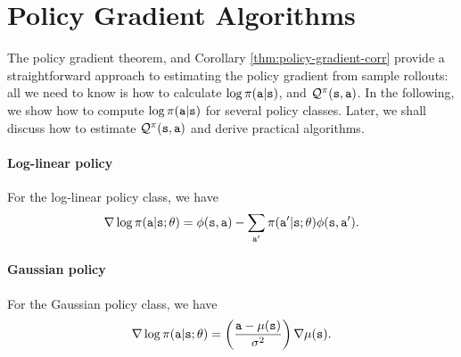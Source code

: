 \section{Policy Gradient Algorithms}

The policy gradient theorem, and Corollary \ref{thm:policy-gradient-corr} provide a straightforward approach to estimating the policy gradient from sample rollouts: all we need to know is how to calculate $\log
\pi({\tt a}|{\tt s})$, and $\mathcal{Q}^\pi
({\tt s},{\tt a})$. In the following, we show how to compute $\log
\pi({\tt a}|{\tt s})$ for several policy classes. Later, we shall discuss how to estimate $\mathcal{Q}^\pi
({\tt s},{\tt a})$ and derive practical algorithms.

\paragraph{Log-linear policy}
For the log-linear policy class,  we have 
\[
\nabla \log \pi({\tt a}|{\tt s};\theta)= \phi({\tt s},{\tt a}) - \sum_{{\tt a}'}\pi({\tt a}'|{\tt s};\theta)\phi({\tt s},{\tt a}').
\]

\paragraph{Gaussian policy} For the Gaussian policy class, we have \[
\nabla \log
\pi({\tt a}|{\tt s};\theta) = 
\left(\frac{{\tt a}-\mu({\tt s})}{\sigma^2}\right) \nabla \mu({\tt s}).
\]






